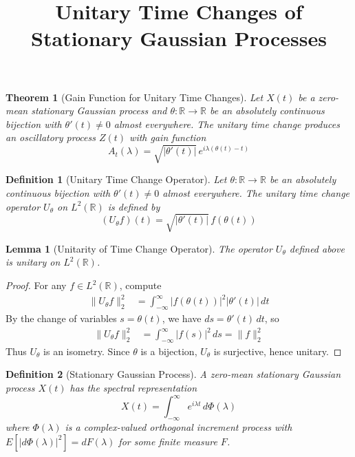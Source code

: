 \documentclass{article}
\title{Unitary Time Changes of Stationary Gaussian Processes}
\author{}
\date{}
\newtheorem{theorem}{Theorem}
\newtheorem{definition}{Definition}
\newtheorem{lemma}{Lemma}
\begin{document}
\maketitle

\begin{theorem}[Gain Function for Unitary Time Changes]
Let $X(t)$ be a zero-mean stationary Gaussian process and $\theta: \mathbb{R} \to \mathbb{R}$ be an absolutely continuous bijection with $\theta'(t) \neq 0$ almost everywhere. The unitary time change produces an oscillatory process $Z(t)$ with gain function
\[
A_t(\lambda) = \sqrt{|\theta'(t)|} \, e^{i\lambda(\theta(t) - t)}
\]
\end{theorem}

\begin{definition}[Unitary Time Change Operator]
Let $\theta: \mathbb{R} \to \mathbb{R}$ be an absolutely continuous bijection with $\theta'(t) \neq 0$ almost everywhere. The unitary time change operator $U_\theta$ on $L^2(\mathbb{R})$ is defined by
\[
(U_\theta f)(t) = \sqrt{|\theta'(t)|} \, f(\theta(t))
\]
\end{definition}

\begin{lemma}[Unitarity of Time Change Operator]
The operator $U_\theta$ defined above is unitary on $L^2(\mathbb{R})$.
\end{lemma}

\begin{proof}
For any $f \in L^2(\mathbb{R})$, compute
\begin{align}
\|U_\theta f\|_2^2 &= \int_{-\infty}^{\infty} |f(\theta(t))|^2 |\theta'(t)| \, dt
\end{align}
By the change of variables $s = \theta(t)$, we have $ds = \theta'(t) \, dt$, so
\begin{align}
\|U_\theta f\|_2^2 &= \int_{-\infty}^{\infty} |f(s)|^2 \, ds = \|f\|_2^2
\end{align}
Thus $U_\theta$ is an isometry. Since $\theta$ is a bijection, $U_\theta$ is surjective, hence unitary.
\end{proof}

\begin{definition}[Stationary Gaussian Process]
A zero-mean stationary Gaussian process $X(t)$ has the spectral representation
\[
X(t) = \int_{-\infty}^{\infty} e^{i\lambda t} \, d\Phi(\lambda)
\]
where $\Phi(\lambda)$ is a complex-valued orthogonal increment process with $E[|d\Phi(\lambda)|^2] = dF(\lambda)$ for some finite measure $F$.
\end{definition}
\end{document}
